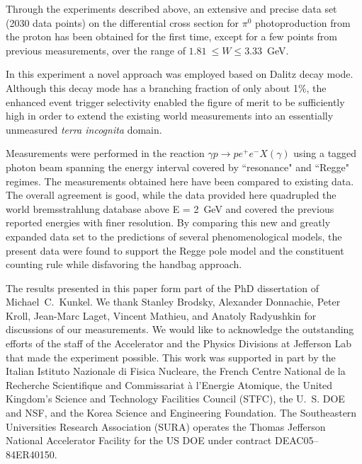 \documentclass[aps,prc,twocolumn,floatfix,showpacs,preprintnumbers,amsmath,amssymb,superscriptaddress,linenumbers]{revtex4-1}
\begin{document}

Through the experiments described above, an extensive and precise 
data set (2030 data points) on the differential cross section for 
$\pi^0$ photoproduction from the proton has been obtained 
for the first time, except for a few points from previous measurements, 
over the range of $1.81~\leq W\leq 3.33$~GeV. 

In this experiment a novel approach was employed based on Dalitz decay 
mode. Although this decay mode has a branching fraction of only about 1\%, 
the enhanced event trigger selectivity enabled the figure of merit to be 
sufficiently high in order to extend the existing world measurements into 
an essentially unmeasured {\it terra incognita} domain.

Measurements were 
performed in the reaction $\gamma p\rightarrow pe^+e^-X(\gamma)$ 
using a tagged photon beam spanning the energy interval covered 
by ``resonance" and ``Regge" regimes.
The measurements obtained here have been compared to existing 
data. The overall agreement is good, while the data provided 
here quadrupled the world bremsstrahlung database above E = 
2~GeV and covered the previous reported energies with finer 
resolution. By comparing this new and greatly expanded data set 
to the predictions of several phenomenological models, the 
present data were found to support the Regge pole model and the 
constituent counting rule while disfavoring the handbag approach.
  
The results presented in this paper form part of the 
PhD dissertation of Michael~C.~Kunkel.  We thank Stanley Brodsky, 
Alexander Donnachie, Peter Kroll, Jean-Marc Laget, Vincent Mathieu, 
and Anatoly Radyushkin for discussions of our measurements. We 
would like to acknowledge the outstanding efforts of the staff of 
the Accelerator and the Physics Divisions at Jefferson Lab that 
made the experiment possible.  This work was supported in part by 
the Italian Istituto Nazionale di Fisica Nucleare, the French 
Centre National de la Recherche Scientifique and Commissariat \`a 
l'Energie Atomique, the United Kingdom's Science and Technology 
Facilities Council (STFC), the U.~S. DOE and NSF, and the Korea 
Science and Engineering Foundation. The Southeastern Universities 
Research Association (SURA) operates the Thomas Jefferson National 
Accelerator Facility for the US DOE under contract DEAC05--84ER40150.
\end{document}

